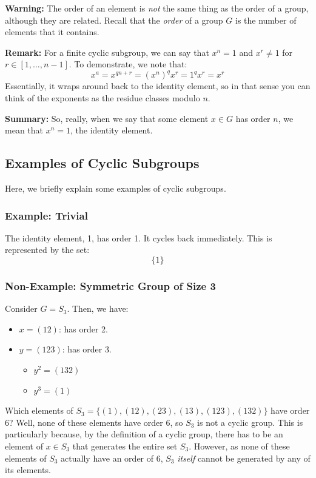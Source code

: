 \documentclass[letterpaper]{article}
\begin{document}
\textbf{Warning:} The order of an element is \emph{not} the same thing as the order of a group, although they are related. Recall that the \emph{order} of a group $G$ is the number of elements that it contains.

\bigskip

\textbf{Remark:} For a finite cyclic subgroup, we can say that $\boxed{x^n = 1}$ and $x^r \neq 1$ for $r \in [1, \dots, n - 1]$. To demonstrate, we note that: 
\[x^a = x^{qn + r} = (x^{n})^{q} x^r = 1^q x^r = x^r\]
Essentially, it wraps around back to the identity element, so in that sense you can think of the exponents as the residue classes modulo $n$. 

\bigskip 

\textbf{Summary:} So, really, when we say that some element $x \in G$ has order $n$, we mean that $x^n = 1$, the identity element. 

\subsection{Examples of Cyclic Subgroups}
Here, we briefly explain some examples of cyclic subgroups.

\subsubsection{Example: Trivial}
The identity element, 1, has order 1. It cycles back immediately. This is represented by the set: 
\[\{1\}\]

\subsubsection{Non-Example: Symmetric Group of Size 3}
Consider $G = S_3$. Then, we have: 
\begin{itemize}
    \item $x = (1 2)$: has order 2. 
    \item $y = (1 2 3)$: has order 3.
    \begin{itemize}
        \item $y^2 = (1 3 2)$
        \item $y^3 = (1)$
    \end{itemize}
\end{itemize}
Which elements of $S_3 = \{(1), (1 2), (2 3), (1 3), (1 2 3), (1 3 2)\}$ have order 6? Well, none of these elements have order 6, so $S_3$ is not a cyclic group. This is particularly because, by the definition of a cyclic group, there has to be an element of $x \in S_3$ that generates the entire set $S_3$. However, as none of these elements of $S_3$ actually have an order of 6, $S_3$ \emph{itself} cannot be generated by any of its elements. 
\end{document}
